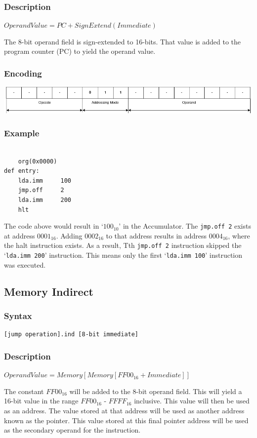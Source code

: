 \subsubsection{Description}
$OperandValue = PC + SignExtend(Immediate)$
\par The 8-bit operand field is sign-extended to 16-bits.
That value is added to the program counter (PC) to yield the operand value.

\subsubsection{Encoding}
\begin{center}
    \includegraphics[scale=0.40]{img/Andromeda-OFF.drawio}
\end{center}

\subsubsection{Example}
\begin{verbatim}

    org(0x0000)
def entry:
    lda.imm     100
    jmp.off     2
    lda.imm     200
    hlt

\end{verbatim}
The code above would result in `$100_{10}$' in the Accumulator.
The \texttt{jmp.off 2} exists at address $0001_{16}$.
Adding $0002_{16}$ to that address results in address $0004_{16}$, where the halt instruction exists.
As a result, Tth \texttt{jmp.off 2} instruction skipped the `\texttt{lda.imm 200}' instruction.
This means only the first `\texttt{lda.imm 100}' instruction was executed.
\pagebreak

\subsection{Memory Indirect}\label{subsec:memory-indirect-(ind)}
\subsubsection{Syntax}
\begin{verbatim}[jump operation].ind [8-bit immediate]\end{verbatim}

\subsubsection{Description}
$OperandValue = Memory[Memory[FF00_{16} + Immediate]]$
\par The constant $FF00_{16}$ will be added to the 8-bit operand field.
This will yield a 16-bit value in the range $FF00_{16}$ - $FFFF_{16}$ inclusive.
This value will then be used as an address.
The value stored at that address will be used as another address known as the pointer.
This value stored at this final pointer address will be used as the secondary operand for the instruction.

